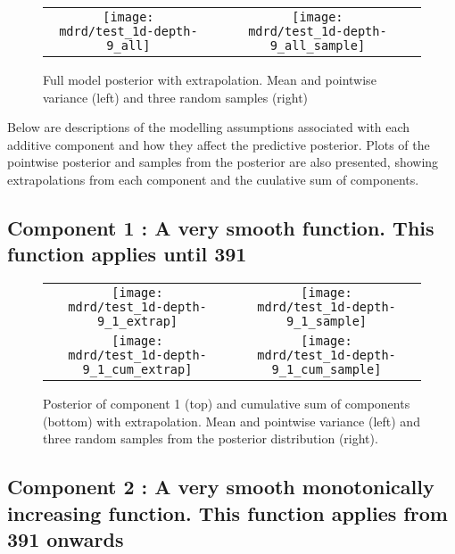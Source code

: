 \documentclass{article} %
\begin{document}
\begin{figure}[H]
\newcommand{\wmgd}{0.5\columnwidth}
\newcommand{\hmgd}{3.0cm}
\newcommand{\mdrd}{test_1d-depth-9}
\newcommand{\mbm}{\hspace{-0.3cm}}
\begin{tabular}{cc}
\mbm \texttt{[image: \\mdrd/test\_1d-depth-9\_all]} & \texttt{[image: \\mdrd/test\_1d-depth-9\_all\_sample]}
\end{tabular}
\caption{Full model posterior with extrapolation. Mean and pointwise variance (left) and three random samples (right)}
\label{fig:extrap}
\end{figure}

Below are descriptions of the modelling assumptions associated with each additive component and how they affect the predictive posterior.
Plots of the pointwise posterior and samples from the posterior are also presented, showing extrapolations from each component and the cuulative sum of components.

\subsection{Component 1 : A very smooth function. This function applies until  391}



\begin{figure}[H]
\newcommand{\wmgd}{0.5\columnwidth}
\newcommand{\hmgd}{3.0cm}
\newcommand{\mdrd}{test_1d-depth-9}
\newcommand{\mbm}{\hspace{-0.3cm}}
\begin{tabular}{cc}
\mbm \texttt{[image: \\mdrd/test\_1d-depth-9\_1\_extrap]} & \texttt{[image: \\mdrd/test\_1d-depth-9\_1\_sample]} \\
\mbm \texttt{[image: \\mdrd/test\_1d-depth-9\_1\_cum\_extrap]} & \texttt{[image: \\mdrd/test\_1d-depth-9\_1\_cum\_sample]}
\end{tabular}
\caption{Posterior of component 1 (top) and cumulative sum of components (bottom) with extrapolation. Mean and pointwise variance (left) and three random samples from the posterior distribution (right).}
\label{fig:extrap1}
\end{figure}

\subsection{Component 2 : A very smooth monotonically increasing function. This function applies from  391 onwards}
\end{document}
